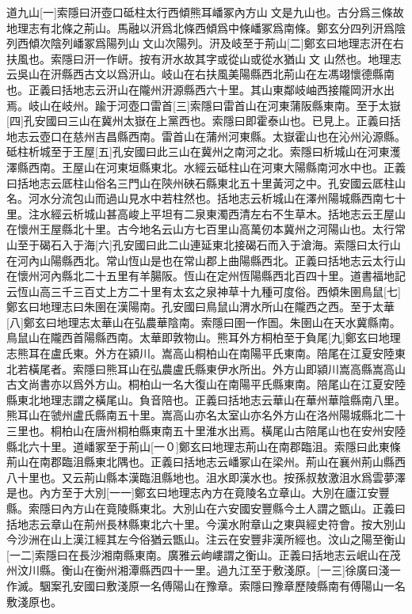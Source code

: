 道九山[一]索隱曰汧壺口砥柱太行西傾熊耳嶓冢內方山文是九山也。古分爲三條故地理志有北條之荊山。馬融以汧爲北條西傾爲中條嶓冢爲南條。鄭玄分四列汧爲陰列西傾次陰列嶓冢爲陽列山文山次陽列。汧及岐至于荊山[二]鄭玄曰地理志汧在右扶風也。索隱曰汧一作岍。按有汧水故其字或從山或從水猶山文 山然也。地理志云吳山在汧縣西古文以爲汧山。岐山在右扶風美陽縣西北荊山在左馮翊懷德縣南也。正義曰括地志云汧山在隴州汧源縣西六十里。其山東鄰岐岫西接隴岡汧水出焉。岐山在岐州。踰于河壺口雷首[三]索隱曰雷首山在河東蒲阪縣東南。至于太嶽[四]孔安國曰三山在冀州太嶽在上黨西也。索隱曰即霍泰山也。已見上。正義曰括地志云壺口在慈州吉昌縣西南。雷首山在蒲州河東縣。太嶽霍山也在沁州沁源縣。砥柱析城至于王屋[五]孔安國曰此三山在冀州之南河之北。索隱曰析城山在河東濩澤縣西南。王屋山在河東垣縣東北。水經云砥柱山在河東大陽縣南河水中也。正義曰括地志云厎柱山俗名三門山在陝州硤石縣東北五十里黃河之中。孔安國云厎柱山名。河水分流包山而過山見水中若柱然也。括地志云析城山在澤州陽城縣西南七十里。注水經云析城山甚高峻上平坦有二泉東濁西清左右不生草木。括地志云王屋山在懷州王屋縣北十里。古今地名云山方七百里山高萬仞本冀州之河陽山也。太行常山至于碣石入于海[六]孔安國曰此二山連延東北接碣石而入于滄海。索隱曰太行山在河內山陽縣西北。常山恆山是也在常山郡上曲陽縣西北。正義曰括地志云太行山在懷州河內縣北二十五里有羊腸阪。恆山在定州恆陽縣西北百四十里。道書福地記云恆山高三千三百丈上方二十里有太玄之泉神草十九種可度俗。西傾朱圉鳥鼠[七]鄭玄曰地理志曰朱圉在漢陽南。孔安國曰鳥鼠山渭水所山在隴西之西。至于太華[八]鄭玄曰地理志太華山在弘農華陰南。索隱曰圉一作圄。朱圉山在天水冀縣南。鳥鼠山在隴西首陽縣西南。太華即敦物山。熊耳外方桐柏至于負尾[九]鄭玄曰地理志熊耳在盧氏東。外方在潁川。嵩高山桐柏山在南陽平氏東南。陪尾在江夏安陸東北若橫尾者。索隱曰熊耳山在弘農盧氏縣東伊水所出。外方山即潁川嵩高縣嵩高山古文尚書亦以爲外方山。桐柏山一名大復山在南陽平氏縣東南。陪尾山在江夏安陸縣東北地理志謂之橫尾山。負音陪也。正義曰括地志云華山在華州華陰縣南八里。熊耳山在虢州盧氏縣南五十里。嵩高山亦名太室山亦名外方山在洛州陽城縣北二十三里也。桐柏山在唐州桐柏縣東南五十里淮水出焉。橫尾山古陪尾山也在安州安陸縣北六十里。道嶓冢至于荊山[一０]鄭玄曰地理志荊山在南郡臨沮。索隱曰此東條荊山在南郡臨沮縣東北隅也。正義曰括地志云嶓冢山在梁州。荊山在襄州荊山縣西八十里也。又云荊山縣本漢臨沮縣地也。沮水即漢水也。按孫叔敖激沮水爲雲夢澤是也。內方至于大別[一一]鄭玄曰地理志內方在竟陵名立章山。大別在廬江安豐縣。索隱曰內方山在竟陵縣東北。大別山在六安國安豐縣今土人謂之甑山。正義曰括地志云章山在荊州長林縣東北六十里。今漢水附章山之東與經史符會。按大別山今沙洲在山上漢江經其左今俗猶云甑山。注云在安豐非漢所經也。汶山之陽至衡山[一二]索隱曰在長沙湘南縣東南。廣雅云岣嶁謂之衡山。正義曰括地志云岷山在茂州汶川縣。衡山在衡州湘潭縣西四十一里。過九江至于敷淺原。[一三]徐廣曰淺一作滅。駰案孔安國曰敷淺原一名傅陽山在豫章。索隱曰豫章歷陵縣南有傅陽山一名敷淺原也。
